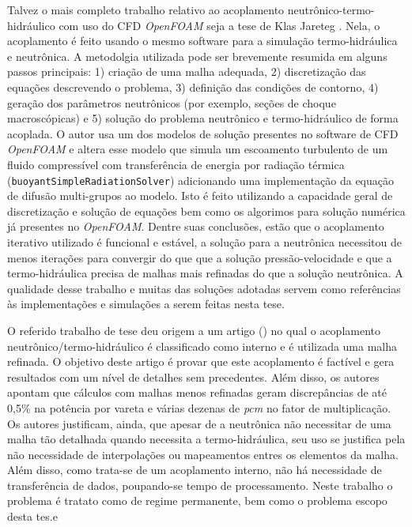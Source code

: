 Talvez o mais completo trabalho relativo ao acoplamento neutrônico-termo-hidráulico com uso do 
CFD \textit{OpenFOAM} seja a tese de Klas Jareteg \cite{Jareteg2012}. Nela, o acoplamento é feito usando o mesmo 
software para a simulação termo-hidráulica e neutrônica. A metodolgia utilizada pode ser brevemente 
resumida em alguns passos principais: 1) criação de uma malha adequada, 2) discretização das 
equações descrevendo o problema, 3) definição das condições de contorno, 4) geração dos 
parâmetros neutrônicos (por exemplo, seções de choque macroscópicas) e 5) solução do 
problema neutrônico e termo-hidráulico de forma acoplada. O autor usa um dos modelos de solução presentes no 
software de CFD \textit{OpenFOAM} \cite{OpenFOAM2013} e 
altera esse modelo que simula um escoamento turbulento de um fluido compressível com transferência de energia
por radiação térmica (\texttt{buoyantSimpleRadiationSolver}) adicionando uma implementação da equação de difusão multi-grupos 
ao modelo. Isto é feito utilizando a capacidade geral de discretização e solução de equações bem como os algorimos 
para solução numérica já presentes no \textit{OpenFOAM}. Dentre suas conclusões, estão que o acoplamento iterativo 
utilizado é funcional e estável, a solução para a neutrônica necessitou de menos iterações para convergir 
do que que a solução pressão-velocidade e que a termo-hidráulica precisa de malhas mais refinadas do que a solução 
neutrônica. A qualidade desse trabalho e muitas das soluções adotadas servem como referências às implementações 
e simulações a serem feitas nesta tese.

O referido trabalho de tese deu origem a um artigo (\cite{Jarateg2014}) no qual o acoplamento
neutrônico/termo-hidráulico é classificado como interno e é utilizada uma malha
refinada. O objetivo deste artigo é provar que
este acoplamento é factível e gera resultados com um nível de detalhes sem precedentes. Além
disso, os autores apontam que cálculos com malhas menos refinadas geram discrepâncias
de até 0,5\% na potência por vareta e várias dezenas de \textit{pcm} no fator de multiplicação.
Os autores justificam, ainda, que apesar de a neutrônica não necessitar de uma malha
tão detalhada quando necessita a termo-hidráulica, seu uso se justifica pela não necessidade
de interpolações ou mapeamentos entres os elementos da malha. Além disso, como trata-se
de um acoplamento interno, não há necessidade de transferência de dados, poupando-se
tempo de processamento.
Neste trabalho o problema é tratato como de regime permanente, bem como o problema escopo
desta tes.e


